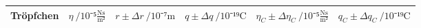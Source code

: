 \begin{landscape}
    \begin{table}[h]
        \begin{center}
        \captionsetup{width=\linewidth}
        \label{tab:ergebnisse}
            \begin{tabular}{c S[table-format=1.4] S[table-format=1.1] S[table-format=1.2] S[table-format=1.3] S[table-format=1.2]}
		\toprule
		{Tröpfchen} & {$\eta\:/10⁻⁵\frac{\si{\newton\second}}{{\si\meter²}}$} &{$r\pm\Delta{r}\:/10⁻⁷\si\meter$}&{$q\pm\Delta{q}\:/10⁻¹⁹\si\coulomb$}&{$\eta_C\pm\Delta{\eta_C}\:/10⁻⁵\frac{\si{\newton\second}}{{\si\meter²}}$}&{$q_C\pm\Delta{q_C}\:/10⁻¹⁹\si\coulomb$} \\
		\midrule



\end{tabular}
\end{center}
\end{table}
\end{landscape}

